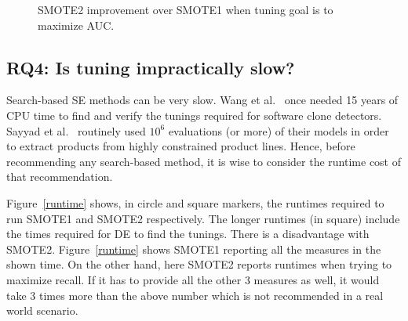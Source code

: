 \begin{figure}[!t]
    \caption{SMOTE2 improvement over SMOTE1 when tuning goal is to maximize AUC.}
    \vspace{-10pt}
    \label{fig:auc}
\vspace{-0.6cm}

\end{figure} 

\subsection{\textbf{RQ4: Is tuning impractically slow?}}

Search-based SE methods can be very slow. Wang et al.~\cite{wang2013searching} once needed 15
years of CPU time to find and verify the tunings required for software
clone detectors. Sayyad et al.~\cite{sayyad2013scalable} routinely used
$10^6$ evaluations (or more) of their models in order to extract
products from highly constrained product
lines. Hence, before recommending any
search-based method, it is wise to consider the runtime cost of that
recommendation.


 Figure~\ref{runtime} shows,  in circle and square markers, the
  runtimes required to run SMOTE1 and SMOTE2 respectively.  The
  longer runtimes (in square) include the times required for DE to find
  the tunings. There is a disadvantage with SMOTE2. Figure~\ref{runtime} shows SMOTE1 reporting all the measures in the shown time. On the other hand, here SMOTE2 reports runtimes when trying to maximize recall. If it has to provide all the other 3 measures as well, it would take 3 times more than the above number which is not recommended in a real world scenario. 
  
